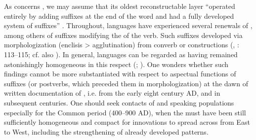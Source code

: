 \documentclass[output=paper]{langsci/langscibook}
\begin{document}
As concerns , we may assume that its oldest reconstructable layer “operated entirely by adding suffixes at the end of the word and had a fully developed system of suffixes” \citep[27]{Clauson1962}. Throughout,  languages have experienced several renewals of , among others of suffixes modifying the  of the verb. Such suffixes developed via morphologization (enclisis {\textgreater} agglutination) from converb or  constructions (\citealt[41--43]{Johanson1998a}, \citeyear*{Johanson1998b}: 113--115; cf. also \citealt[262--272]{Erdal2004}). In general,  languages can be regarded as having remained astonishingly homogeneous in this respect (\citealt[181]{Menges1968}; \citealt[111]{Johanson1998b}). One wonders whether such findings cannot be more substantiated with respect to aspectual functions of suffixes (or postverbs, which preceded them in morphologization) at the dawn of written documentation of , i.e. from the early eight century AD, and in subsequent centuries. One should seek contacts of  and  speaking populations especially for the Common  period (400–900 AD), when the   must have been still sufficiently homogeneous and compact for innovations to spread across  from East to West, including the strengthening of already developed patterns.
\end{document}
